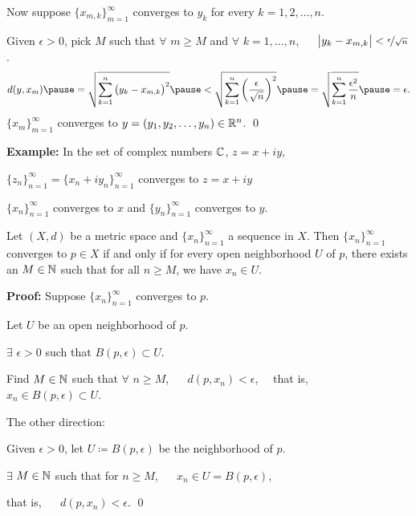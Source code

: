 \documentclass[10pt,aspectratio=169]{beamer}
\begin{document}
\begin{frame}

Now suppose
$\{ x_{m,k} \}_{m=1}^\infty$ converges to $y_k$ for every $k=1,2,\ldots,n$.

\pause
\medskip

Given $\epsilon > 0$, pick $M$ such that $\forall$ $m \geq M$ and
$\forall$ $k = 1,\ldots,n$, ~~
$\bigl\lvert y_k-x_{m,k} \bigr\rvert < \nicefrac{\epsilon}{\sqrt{n}}$.
\pause
\begin{equation*}
d(y,x_m)
\pause
=
\sqrt{\sum_{k=1}^n {\bigl(y_k-x_{m,k}\bigr)}^2}
\pause
<
\sqrt{\sum_{k=1}^n {\left(\frac{\epsilon}{\sqrt{n}}\right)}^2}
\pause
=
\sqrt{\sum_{k=1}^n \frac{{\epsilon^2}}{n}}
\pause
= \epsilon .
\end{equation*}
\pause
\thus \quad
$\{ x_m \}_{m=1}^\infty$ converges to
$y = (y_1,y_2,\ldots,y_n) \in {\mathbb{R}}^n$.
\qed



\pause
\bigskip

\textbf{Example:}
In the set of complex numbers ${\mathbb{C}}$, $z = x+iy$,

\pause
$\{ z_n \}_{n=1}^\infty = \{ x_n + iy_n \}_{n=1}^\infty$ converges
to $z = x+iy$

\pause
\wiffif

$\{ x_n \}_{n=1}^\infty$ converges to $x$
and 
$\{ y_n \}_{n=1}^\infty$ converges to $y$.

\end{frame}

\begin{frame}

\begin{proposition}
Let $(X,d)$ be a metric space and $\{x_n\}_{n=1}^\infty$ a sequence in $X$.  Then
$\{ x_n \}_{n=1}^\infty$ converges to $p \in X$ if and only if for every open neighborhood
$U$ of $p$, there exists an $M \in {\mathbb{N}}$ such that for all $n \geq M$,
we have $x_n \in U$.
\end{proposition}

\pause
\textbf{Proof:}
Suppose $\{ x_n \}_{n=1}^\infty$ converges to $p$.

\pause
Let $U$ be an open neighborhood of $p$.

\pause
\thus \quad $\exists$ $\epsilon > 0$ such that $B(p,\epsilon) \subset U$.

\pause
Find $M \in {\mathbb{N}}$ such that $\forall$ $n \geq M$, ~~ $d(p,x_n) < \epsilon$,
\pause
~~that is,~~ $x_n \in B(p,\epsilon) \subset U$.

\pause
\medskip

The other direction:

\pause
Given $\epsilon > 0$, let $U \coloneqq B(p,\epsilon)$ be the neighborhood of $p$.

\pause
\thus \quad $\exists$ $M \in {\mathbb{N}}$
such that for $n \geq M$, ~~ $x_n \in U = B(p,\epsilon)$,

\pause
that is, ~~ $d(p,x_n) < \epsilon$.
\qed

\end{frame}
\end{document}
